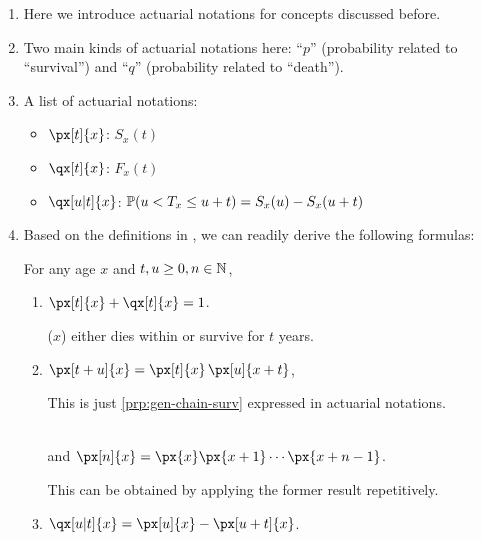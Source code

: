 \begin{enumerate}
\item Here we introduce actuarial notations for concepts discussed before.
\item Two main kinds of actuarial notations here: ``\(p\)'' (probability
related to ``survival'') and ``\(q\)'' (probability related to ``death'').
\item \label{it:actuar-pq} A list of actuarial notations:
\begin{itemize}
\item \(\px[t]{x}\): \(S_x(t)\)
\item \(\qx[t]{x}\): \(F_x(t)\)
\item \(\qx[u|t]{x}\): \(\mathbb{P}\qty(u<T_x\le u+t)=S_x(u)-S_x(u+t)\)
\end{itemize}

\item Based on the definitions in , we can readily
derive the following formulas:
\begin{proposition}
\label{prp:act-notation-prop}
For any age \(x\) and \(t,u\ge 0, n\in\mathbb{N}\),
\begin{enumerate}
\item \(\px[t]{x}+\qx[t]{x}=1\).
\begin{intuition}
(\(x\)) either dies within or survive for \(t\) years.
\end{intuition}
\item \(\px[t+u]{x}=\px[t]{x}\,\px[u]{x+t}\),
\begin{note}
This is just \cref{prp:gen-chain-surv} expressed in actuarial notations.\
\end{note}\\
and
\(\px[n]{x}=\px{x}\px{x+1}\cdots\px{x+n-1}\).
\begin{note}
This can be obtained by applying the former result repetitively.
\end{note}
\item \(\qx[u|t]{x}=\px[u]{x}-\px[u+t]{x}\).
\begin{intuition}


\end{intuition}
\end{enumerate}
\end{proposition}
\end{enumerate}

